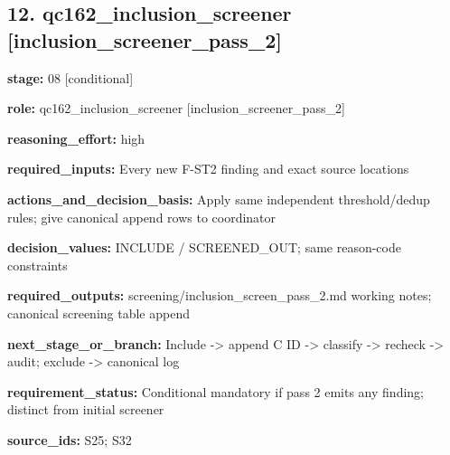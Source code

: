 \documentclass[10pt,a4paper]{article}
\begin{document}
\subsection*{12.\allowbreak{} qc162\_\allowbreak{}inclusion\_\allowbreak{}screener [inclusion\_\allowbreak{}screener\_\allowbreak{}pass\_\allowbreak{}2]}
\textbf{stage:} 08 [conditional]\par
\textbf{role:} qc162\_\allowbreak{}inclusion\_\allowbreak{}screener [inclusion\_\allowbreak{}screener\_\allowbreak{}pass\_\allowbreak{}2]\par
\textbf{reasoning\_\allowbreak{}effort:} high\par
\textbf{required\_\allowbreak{}inputs:} Every new F-\allowbreak{}ST2 finding and exact source locations\par
\textbf{actions\_\allowbreak{}and\_\allowbreak{}decision\_\allowbreak{}basis:} Apply same independent threshold/\allowbreak{}dedup rules; give canonical append rows to coordinator\par
\textbf{decision\_\allowbreak{}values:} INCLUDE /\allowbreak{} SCREENED\_\allowbreak{}OUT; same reason-\allowbreak{}code constraints\par
\textbf{required\_\allowbreak{}outputs:} screening/\allowbreak{}inclusion\_\allowbreak{}screen\_\allowbreak{}pass\_\allowbreak{}2.\allowbreak{}md working notes; canonical screening table append\par
\textbf{next\_\allowbreak{}stage\_\allowbreak{}or\_\allowbreak{}branch:} Include -\allowbreak{}> append C ID -\allowbreak{}> classify -\allowbreak{}> recheck -\allowbreak{}> audit; exclude -\allowbreak{}> canonical log\par
\textbf{requirement\_\allowbreak{}status:} Conditional mandatory if pass 2 emits any finding; distinct from initial screener\par
\textbf{source\_\allowbreak{}ids:} S25; S32\par
\end{document}
